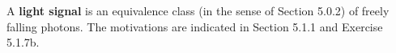 A \textbf{light signal} is an equivalence class (in the sense of Section 5.0.2) of freely falling photons. The motivations are indicated in Section 5.1.1 and Exercise 5.1.7b.
